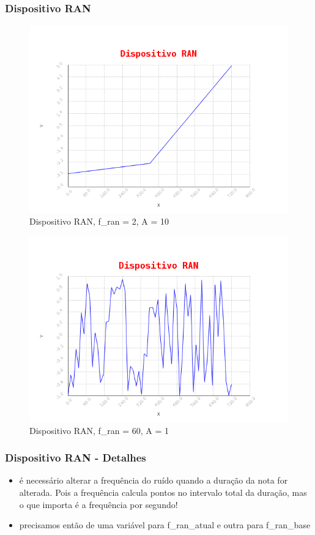 \documentclass{beamer}
\begin{document}
\begin{frame}
 \frametitle{Dispositivo RAN}
 \begin{figure}
  \includegraphics[scale=0.4]{./images/RAN_F_2.png}
  \caption{Dispositivo RAN, f\_ran = 2, A = 10}
   \end{figure}
\end{frame}
   \begin{frame}
 \begin{figure}
  \includegraphics[scale=0.4]{./images/RAN_F_60.png}
  \caption{Dispositivo RAN, f\_ran = 60, A = 1}
 \end{figure} 

\end{frame}

\begin{frame}
 \frametitle{Dispositivo RAN - Detalhes}
 \begin{itemize}
 	\item é necessário alterar a frequência do ruído quando
 	a duração da nota for alterada. Pois a frequência calcula
 	pontos no intervalo total da duração, mas o que importa é a
 	frequência por segundo!
 	\item precisamos então de uma variável para f\_ran\_atual e outra para f\_ran\_base
 \end{itemize}
\end{frame}
\end{document}
